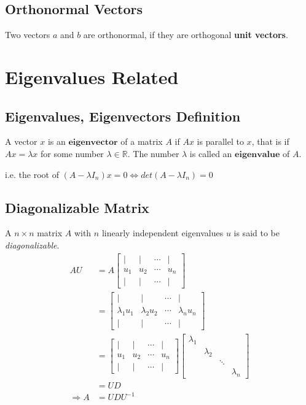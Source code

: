 \documentclass[11pt]{elegantbook}
\begin{document}
\section{Orthonormal Vectors}
Two vectors $a$ and $b$ are orthonormal, if they are orthogonal \textbf{unit vectors}.





\chapter{Eigenvalues Related}
\section{Eigenvalues, Eigenvectors Definition}
A vector $x$ is an $\textbf{eigenvector}$ of a matrix $A$ if $Ax$ is parallel to $x$, that is if $Ax = \lambda x$ for some number $\lambda\in \mathbb{R}$. The number $\lambda$ is called an $\textbf{eigenvalue}$ of $A$.

i.e. the root of $(A-\lambda I_n)x=0 \Leftrightarrow det(A-\lambda I_n)=0$





\section{Diagonalizable Matrix}
A $n\times n$ matrix $A$ with $n$ linearly independent eigenvalues $u$ is said to be \textit{diagonalizable}.
\begin{equation}
    \begin{aligned}
        AU&=A\begin{bmatrix}
            |&|&\cdots&|\\
            u_1&u_2&\cdots&u_n\\
            |&|&\cdots&|
        \end{bmatrix}\\
        &=\begin{bmatrix}
            |&|&\cdots&|\\
            \lambda_1u_1&\lambda_2u_2&\cdots&\lambda_nu_n\\
            |&|&\cdots&|
        \end{bmatrix}\\
        &=\begin{bmatrix}
            |&|&\cdots&|\\
            u_1&u_2&\cdots&u_n\\
            |&|&\cdots&|
        \end{bmatrix}\begin{bmatrix}
            \lambda_1&&&\\
            &\lambda_2&&\\
            &&\ddots&\\
            &&&\lambda_n
        \end{bmatrix}\\
        &=UD\\
        \Rightarrow	A&=UDU^{-1}
    \end{aligned}
    \nonumber
\end{equation}
\end{document}
